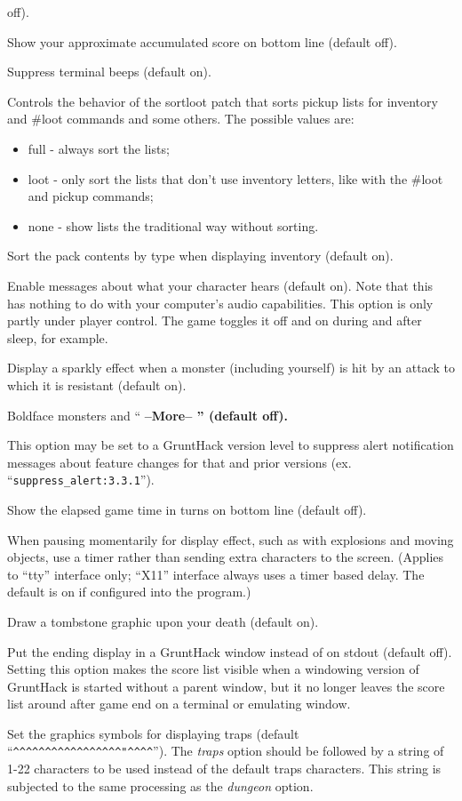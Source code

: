 off).
\item[\tb{showscore}]
Show your approximate accumulated score on bottom line (default off).
\item[\tb{``silent  ''}]
Suppress terminal beeps (default on).
\item[\tb{sortloot}]
Controls the behavior of the sortloot patch that sorts pickup lists for
inventory and \#loot commands and some others.
The possible values are:
\begin{itemize}
\item full - always sort the lists;
\item loot - only sort the lists that don't use inventory
       letters, like with the \#loot and pickup commands;
\item none - show lists the traditional way without sorting.
\end{itemize}
\item[\tb{sortpack}]
Sort the pack contents by type when displaying inventory (default on).
\item[\tb{sound}]
Enable messages about what your character hears (default on).
Note that this has nothing to do with your computer's audio capabilities.
This option is only partly under player control.  The game toggles it
off and on during and after sleep, for example.
\item[\tb{sparkle}]
Display a sparkly effect when a monster (including yourself) is hit by an
attack to which it is resistant (default on).
\item[\tb{standout}]
Boldface monsters and ``%
\bf --More--\rm%
'' (default off).
\item[\tb{suppress\_alert}]
This option may be set to a GruntHack version level to suppress
alert notification messages about feature changes for that 
and prior versions (ex. ``{\tt suppress\_alert:3.3.1}'').
\item[\tb{``time    ''}]
Show the elapsed game time in turns on bottom line (default off).
\item[\tb{timed\_delay}]
When pausing momentarily for display effect, such as with explosions and
moving objects, use a timer rather than sending extra characters to the
screen.  (Applies to ``tty'' interface only; ``X11'' interface always
uses a timer based delay.  The default is on if configured into the
program.)
\item[\tb{tombstone}]
Draw a tombstone graphic upon your death (default on).
\item[\tb{toptenwin}]
Put the ending display in a GruntHack window instead of on stdout (default off).
Setting this option makes the score list visible when a windowing version
of GruntHack is started without a parent window, but it no longer leaves
the score list around after game end on a terminal or emulating window.
\item[\tb{traps}]
Set the graphics symbols for displaying traps (default
``\verb&^^^^^^^^^^^^^^^^^"^^^^&'').
The
{\it traps }
option should be followed by a string of 1-22
characters to be used instead of the default traps characters.
This string is subjected to the same processing as the
{\it dungeon }
option.

